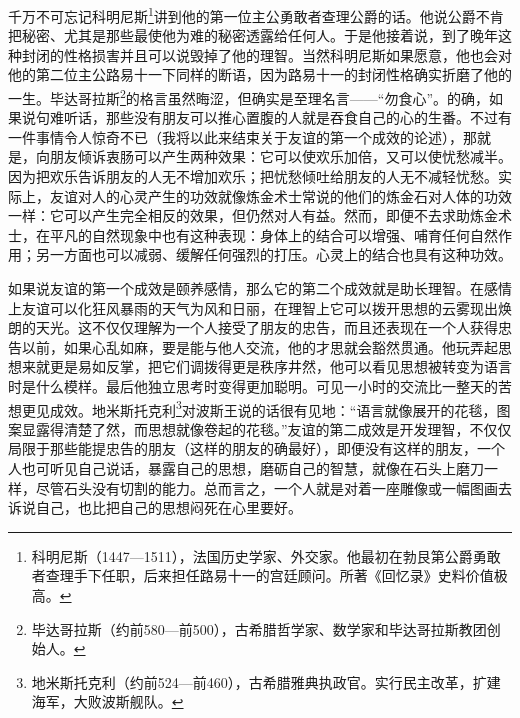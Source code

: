 \par 千万不可忘记科明尼斯\footnote{科明尼斯（1447—1511），法国历史学家、外交家。他最初在勃艮第公爵勇敢者查理手下任职，后来担任路易十一的宫廷顾问。所著《回忆录》史料价值极高。}讲到他的第一位主公勇敢者查理公爵的话。他说公爵不肯把秘密、尤其是那些最使他为难的秘密透露给任何人。于是他接着说，到了晚年这种封闭的性格损害并且可以说毁掉了他的理智。当然科明尼斯如果愿意，他也会对他的第二位主公路易十一下同样的断语，因为路易十一的封闭性格确实折磨了他的一生。毕达哥拉斯\footnote{毕达哥拉斯（约前580—前500），古希腊哲学家、数学家和毕达哥拉斯教团创始人。}的格言虽然晦涩，但确实是至理名言——“勿食心”。的确，如果说句难听话，那些没有朋友可以推心置腹的人就是吞食自己的心的生番。不过有一件事情令人惊奇不已（我将以此来结束关于友谊的第一个成效的论述），那就是，向朋友倾诉衷肠可以产生两种效果：它可以使欢乐加倍，又可以使忧愁减半。因为把欢乐告诉朋友的人无不增加欢乐；把忧愁倾吐给朋友的人无不减轻忧愁。实际上，友谊对人的心灵产生的功效就像炼金术士常说的他们的炼金石对人体的功效一样：它可以产生完全相反的效果，但仍然对人有益。然而，即便不去求助炼金术士，在平凡的自然现象中也有这种表现：身体上的结合可以增强、哺育任何自然作用；另一方面也可以减弱、缓解任何强烈的打压。心灵上的结合也具有这种功效。
\par 如果说友谊的第一个成效是颐养感情，那么它的第二个成效就是助长理智。在感情上友谊可以化狂风暴雨的天气为风和日丽，在理智上它可以拨开思想的云雾现出焕朗的天光。这不仅仅理解为一个人接受了朋友的忠告，而且还表现在一个人获得忠告以前，如果心乱如麻，要是能与他人交流，他的才思就会豁然贯通。他玩弄起思想来就更是易如反掌，把它们调拨得更是秩序井然，他可以看见思想被转变为语言时是什么模样。最后他独立思考时变得更加聪明。可见一小时的交流比一整天的苦想更见成效。地米斯托克利\footnote{地米斯托克利（约前524—前460），古希腊雅典执政官。实行民主改革，扩建海军，大败波斯舰队。}对波斯王说的话很有见地：“语言就像展开的花毯，图案显露得清楚了然，而思想就像卷起的花毯。”友谊的第二成效是开发理智，不仅仅局限于那些能提忠告的朋友（这样的朋友的确最好），即便没有这样的朋友，一个人也可听见自己说话，暴露自己的思想，磨砺自己的智慧，就像在石头上磨刀一样，尽管石头没有切割的能力。总而言之，一个人就是对着一座雕像或一幅图画去诉说自己，也比把自己的思想闷死在心里要好。
